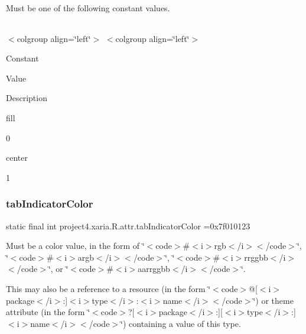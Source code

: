 Must be one of the following constant values.

\tabulinesep=1mm
\begin{longtabu} spread 0pt [c]{*{0}{|X[-1]}|}
\hline
\end{longtabu}
$<$colgroup align=\char`\"{}left\char`\"{}$>$ $<$colgroup align=\char`\"{}left\char`\"{}$>$ 

Constant

Value

Description 

{\ttfamily fill}

0

{\ttfamily center}

1\mbox{\label{classproject4_1_1xaria_1_1R_1_1attr_a19e4019b1c5424ef5fbba1b7fa1b5468}} 
\subsubsection{\texorpdfstring{tab\+Indicator\+Color}{tabIndicatorColor}}
{\footnotesize\ttfamily static final int project4.\+xaria.\+R.\+attr.\+tab\+Indicator\+Color =0x7f010123\hspace{0.3cm}{\ttfamily [static]}}

Must be a color value, in the form of \char`\"{}$<$code$>$\#$<$i$>$rgb$<$/i$>$$<$/code$>$\char`\"{}, \char`\"{}$<$code$>$\#$<$i$>$argb$<$/i$>$$<$/code$>$\char`\"{}, \char`\"{}$<$code$>$\#$<$i$>$rrggbb$<$/i$>$$<$/code$>$\char`\"{}, or \char`\"{}$<$code$>$\#$<$i$>$aarrggbb$<$/i$>$$<$/code$>$\char`\"{}. 

This may also be a reference to a resource (in the form \char`\"{}$<$code$>$@\mbox{[}$<$i$>$package$<$/i$>$\+:\mbox{]}$<$i$>$type$<$/i$>$\+:$<$i$>$name$<$/i$>$$<$/code$>$\char`\"{}) or theme attribute (in the form \char`\"{}$<$code$>$?\mbox{[}$<$i$>$package$<$/i$>$\+:\mbox{]}\mbox{[}$<$i$>$type$<$/i$>$\+:\mbox{]}$<$i$>$name$<$/i$>$$<$/code$>$\char`\"{}) containing a value of this type. \mbox{\label{classproject4_1_1xaria_1_1R_1_1attr_a67f2f0cb72396a8b531135518789e68b}} 
